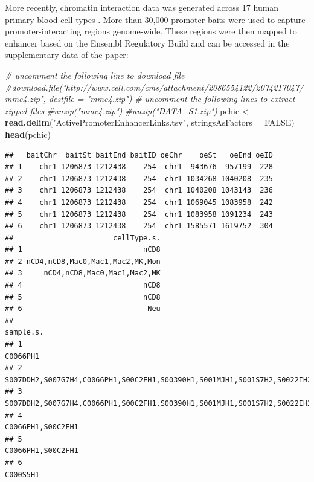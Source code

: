 \documentclass[9pt,a4paper,]{extarticle}
\newenvironment{Shaded}{\begin{snugshade}}{\end{snugshade}}
\newcommand{\KeywordTok}[1]{\textcolor[rgb]{0.13,0.29,0.53}{\textbf{#1}}}
\newcommand{\DataTypeTok}[1]{\textcolor[rgb]{0.13,0.29,0.53}{#1}}
\newcommand{\StringTok}[1]{\textcolor[rgb]{0.31,0.60,0.02}{#1}}
\newcommand{\CommentTok}[1]{\textcolor[rgb]{0.56,0.35,0.01}{\textit{#1}}}
\newcommand{\OtherTok}[1]{\textcolor[rgb]{0.56,0.35,0.01}{#1}}
\newcommand{\NormalTok}[1]{#1}
\begin{document}
More recently, chromatin interaction data was generated across 17 human primary blood cell types \citep{Javierre2016}.
More than 30,000 promoter baits were used to capture promoter-interacting regions genome-wide.
These regions were then mapped to enhancer based on the Ensembl Regulatory Build \citep{Zerbino2015} and can be accessed in the supplementary data of the paper:

\begin{Shaded}
\begin{Highlighting}[]
\CommentTok{# uncomment the following line to download file}
\CommentTok{#download.file("http://www.cell.com/cms/attachment/2086554122/2074217047/mmc4.zip", destfile = "mmc4.zip")}
\CommentTok{# uncomment the following lines to extract zipped files}
\CommentTok{#unzip("mmc4.zip")}
\CommentTok{#unzip("DATA_S1.zip")}
\NormalTok{pchic <-}\StringTok{ }\KeywordTok{read.delim}\NormalTok{(}\StringTok{"ActivePromoterEnhancerLinks.tsv"}\NormalTok{, }\DataTypeTok{stringsAsFactors =} \OtherTok{FALSE}\NormalTok{)}
\KeywordTok{head}\NormalTok{(pchic)}
\end{Highlighting}
\end{Shaded}

\begin{verbatim}
##   baitChr  baitSt baitEnd baitID oeChr    oeSt   oeEnd oeID
## 1    chr1 1206873 1212438    254  chr1  943676  957199  228
## 2    chr1 1206873 1212438    254  chr1 1034268 1040208  235
## 3    chr1 1206873 1212438    254  chr1 1040208 1043143  236
## 4    chr1 1206873 1212438    254  chr1 1069045 1083958  242
## 5    chr1 1206873 1212438    254  chr1 1083958 1091234  243
## 6    chr1 1206873 1212438    254  chr1 1585571 1619752  304
##                       cellType.s.
## 1                            nCD8
## 2 nCD4,nCD8,Mac0,Mac1,Mac2,MK,Mon
## 3     nCD4,nCD8,Mac0,Mac1,Mac2,MK
## 4                            nCD8
## 5                            nCD8
## 6                             Neu
##                                                                                                     sample.s.
## 1                                                                                                    C0066PH1
## 2 S007DDH2,S007G7H4,C0066PH1,S00C2FH1,S00390H1,S001MJH1,S001S7H2,S0022IH2,S00622H1,S00BS4H1,S004BTH2,C000S5H2
## 3          S007DDH2,S007G7H4,C0066PH1,S00C2FH1,S00390H1,S001MJH1,S001S7H2,S0022IH2,S00622H1,S00BS4H1,S004BTH2
## 4                                                                                           C0066PH1,S00C2FH1
## 5                                                                                           C0066PH1,S00C2FH1
## 6                                                                                                    C000S5H1
\end{verbatim}
\end{document}
